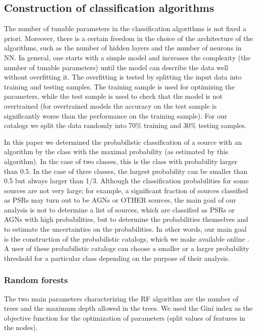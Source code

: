 \documentclass[referee]{aa} %
\newcommand{\lb}{\label}
\begin{document}
\subsection{Construction of classification algorithms}

The number of tunable parameters in the classification algorithms is not fixed a priori. 
Moreover, there is a certain freedom in the choice of the architecture of the algorithms, such as
the number of hidden layers and the number of neurons in NN.
In general, one starts with a simple model and increases the complexity (the number of tunable parameters)
until the model can describe the data well without overfitting it.
The overfitting is tested by splitting the input data into training and testing samples.
The training sample is used for optimizing the parameters,
while the test sample is used to check that the model is not overtrained (for overtrained models the accuracy on the test
sample is significantly worse than the performance on the training sample).
For our catalogs we split the data randomly into 70\% training and 30\% testing samples.

In this paper we determined the probabilistic classification of a source with an algorithm by the class with the maximal probability (as estimated by this algorithm). In the case of two classes, this is the class with probability larger than 0.5. In the case of three classes, the largest probability can be smaller than 0.5 but always larger than 1/3. Although the classification probabilities for some sources are not very large; for example, a significant fraction of sources classified as PSRs may turn out to be AGNs or OTHER sources, the main goal of our analysis is not to determine a list of sources, which are classified as PSRs or AGNs with high probabilities, but to determine the probabilities themselves and to estimate the uncertainties on the probabilities. In other words, our main goal is the construction of the probabilistic catalogs, which we make available online \citep{SOM_material}. A user of these probabilistic catalogs can choose a smaller or a larger probability threshold for a particular class depending on the purpose of their analysis.


\subsubsection{Random forests}
\lb{sec:rf}

The two main parameters characterizing the RF algorithm are the number of trees and the maximum depth allowed in the trees. 
We used the Gini index as the objective function for the optimization of parameters (split values of features in the nodes).
\end{document}
